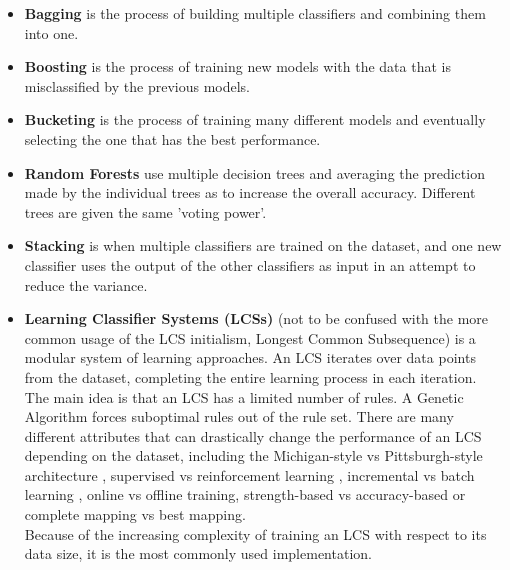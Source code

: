 \begin{itemize}
	\item \textbf{Bagging}
		is the process of building multiple classifiers and combining them into one.
	\item \textbf{Boosting}
		is the process of training new models with the data that is misclassified by the previous models.
	\item \textbf{Bucketing}
		is the process of training many different models and eventually selecting the one that has the best performance.
	\item \textbf{Random Forests}\cite{Breiman2001}
		use multiple decision trees and averaging the prediction made by the individual trees as to increase the overall accuracy. Different trees are given the same 'voting power'.
	\item \textbf{Stacking}
		is when multiple classifiers are trained on the dataset, and one new classifier uses the output of the other classifiers as input in an attempt to reduce the variance.
	\item \textbf{Learning Classifier Systems (LCSs)}
		(not to be confused with the more common usage of the LCS initialism, Longest Common Subsequence) is a modular system of learning approaches. An LCS iterates over data points from the dataset, completing the entire learning process in each iteration. The main idea is that an LCS has a limited number of rules. A Genetic Algorithm forces suboptimal rules out of the rule set. There are many different attributes that can drastically change the performance of an LCS depending on the dataset, including the Michigan-style vs Pittsburgh-style architecture \cite{Puig09}, supervised vs reinforcement learning \cite{kaelbling1996reinforcement}, incremental vs batch learning \cite{clearwater1989incremental}, online vs offline training, strength-based vs accuracy-based \cite{wilson1995classifier} or complete mapping vs best mapping.\\		
		Because of the increasing complexity of training an LCS with respect to its data size, it is the most commonly used implementation.
\end{itemize}


%
%


